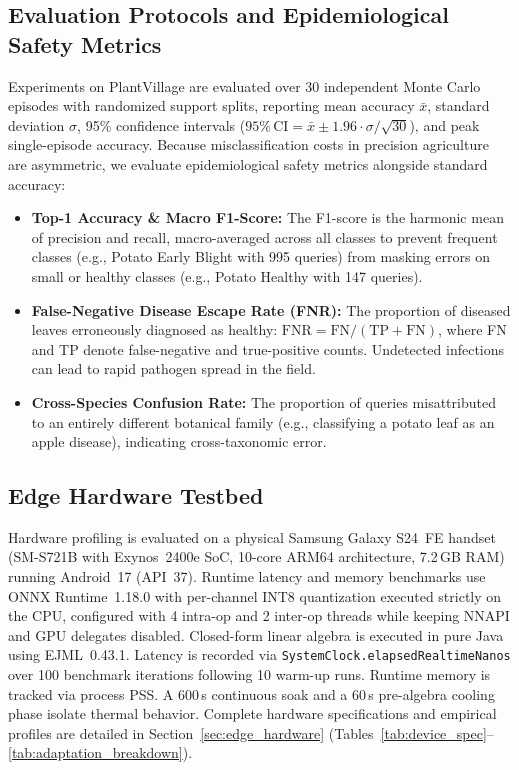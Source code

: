 \documentclass[preprint,12pt]{elsarticle}
\begin{document}
\subsection{Evaluation Protocols and Epidemiological Safety Metrics}
\label{sec:metrics}
Experiments on PlantVillage are evaluated over 30 independent Monte Carlo episodes with randomized support splits, reporting mean accuracy $\bar{x}$, standard deviation $\sigma$, 95\% confidence intervals ($95\%\,\text{CI} = \bar{x} \pm 1.96 \cdot \sigma / \sqrt{30}$), and peak single-episode accuracy. Because misclassification costs in precision agriculture are asymmetric, we evaluate epidemiological safety metrics alongside standard accuracy:
\begin{itemize}
    \item \textbf{Top-1 Accuracy \& Macro F1-Score:} The F1-score is the harmonic mean of precision and recall, macro-averaged across all classes to prevent frequent classes (e.g., Potato Early Blight with 995 queries) from masking errors on small or healthy classes (e.g., Potato Healthy with 147 queries).
    \item \textbf{False-Negative Disease Escape Rate (FNR):} The proportion of diseased leaves erroneously diagnosed as healthy: $\text{FNR} = \text{FN} / (\text{TP} + \text{FN})$, where FN and TP denote false-negative and true-positive counts. Undetected infections can lead to rapid pathogen spread in the field.
    \item \textbf{Cross-Species Confusion Rate:} The proportion of queries misattributed to an entirely different botanical family (e.g., classifying a potato leaf as an apple disease), indicating cross-taxonomic error.
\end{itemize}

\subsection{Edge Hardware Testbed}
Hardware profiling is evaluated on a physical Samsung Galaxy S24~FE handset (SM-S721B with Exynos~2400e SoC, 10-core ARM64 architecture, 7.2\,GB RAM) running Android~17 (API~37). Runtime latency and memory benchmarks use ONNX Runtime~1.18.0 with per-channel INT8 quantization executed strictly on the CPU, configured with 4 intra-op and 2 inter-op threads while keeping NNAPI and GPU delegates disabled. Closed-form linear algebra is executed in pure Java using EJML~0.43.1. Latency is recorded via \texttt{SystemClock.elapsedRealtimeNanos} over 100 benchmark iterations following 10 warm-up runs. Runtime memory is tracked via process PSS. A 600\,s continuous soak and a 60\,s pre-algebra cooling phase isolate thermal behavior. Complete hardware specifications and empirical profiles are detailed in Section~\ref{sec:edge_hardware} (Tables~\ref{tab:device_spec}--\ref{tab:adaptation_breakdown}).
\end{document}
